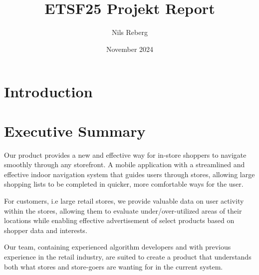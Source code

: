 \documentclass{article}
\title{ETSF25 Projekt Report}
\author{Nils Reberg\\
}
\date{November 2024}
\begin{document}
\maketitle

\section{Introduction}
\newpage
\section{Executive Summary}
Our product provides a new and effective way for in-store shoppers to navigate smoothly through any storefront. A mobile application with a streamlined and effective indoor navigation system that guides users through stores, allowing large shopping lists to be completed in quicker, more comfortable ways for the user. 

For customers, i.e large retail stores, we provide valuable data on user activity within the stores, allowing them to evaluate under/over-utilized areas of their locations while enabling effective advertisement of select products based on shopper data and interests. 

Our team, containing experienced algorithm developers and with previous experience in the retail industry, are suited to create a product that understands both what stores and store-goers are wanting for in the current system.
\end{document}
